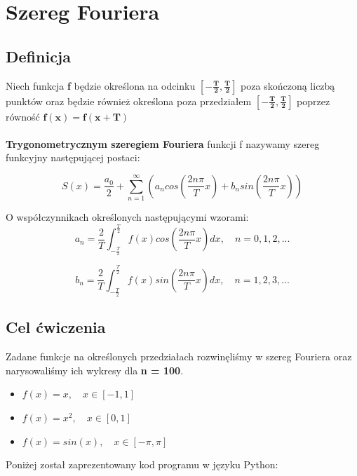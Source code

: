 \section{Szereg Fouriera}
\subsection{Definicja}
Niech funkcja \textbf{f} będzie określona na odcinku $\mathbf{\left[-\frac{T}{2}, \frac{T}{2}\right]}$ poza skończoną liczbą punktów oraz będzie również określona poza przedziałem $\mathbf{\left[-\frac{T}{2}, \frac{T}{2}\right]}${\tiny } poprzez równość $\mathbf{f(x) = f(x + T)}$
\\ \\
\textbf{Trygonometrycznym szeregiem Fouriera} funkcji f nazywamy szereg funkcyjny następującej postaci:

$$S(x) = \frac{a_{0}}{2} + \sum_{n=1}^{\infty} \left(a_{n} cos\left(\frac{2n\pi}{T} x\right) + b_{n} sin\left(\frac{2n\pi}{T} x\right) \right)$$


O współczynnikach określonych następującymi wzorami:
$$ a_{n} = \frac{2}{T} \int_{-\frac{T}{2}}^{\frac{T}{2}} f(x)cos\left(\frac{2n\pi}{T} x \right) dx,	\quad n = 0,1,2,...$$

$$ b_{n} = \frac{2}{T} \int_{-\frac{T}{2}}^{\frac{T}{2}} f(x)sin\left(\frac{2n\pi}{T} x \right) dx,	\quad n = 1,2,3,...$$


\subsection{Cel ćwiczenia}
Zadane funkcje na określonych przedziałach rozwinęliśmy w szereg Fouriera oraz narysowaliśmy ich wykresy dla \textbf{n = 100}.

\begin{itemize}
    \item $f(x) = x, \quad x\in [-1,1]$
    
    \item $f(x) = x^{2}, \quad x\in [0,1]$
    
    \item $f(x) = sin(x), \quad x\in [-\pi,\pi]$
\end{itemize}

\vspace*{1\baselineskip}
Poniżej został zaprezentowany kod programu w języku Python:\\


